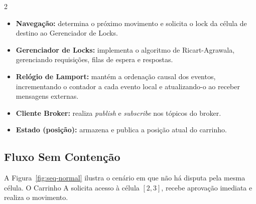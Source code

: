 \documentclass[a4paper]{article}
\begin{document}
\begin{multicols}{2}
\setlength{\columnsep}{0.5cm}

\begin{itemize}
    \item \textbf{Navega\c{c}\~ao:} determina o pr\'oximo movimento e solicita o lock da c\'elula de destino ao Gerenciador de Locks.
    \item \textbf{Gerenciador de Locks:} implementa o algoritmo de Ricart-Agrawala, gerenciando requisi\c{c}\~oes, filas de espera e respostas.
    \item \textbf{Rel\'ogio de Lamport:} mant\'em a ordena\c{c}\~ao causal dos eventos, incrementando o contador a cada evento local e atualizando-o ao receber mensagens externas.
    \item \textbf{Cliente Broker:} realiza \textit{publish} e \textit{subscribe} nos t\'opicos do broker.
    \item \textbf{Estado (posi\c{c}\~ao):} armazena e publica a posi\c{c}\~ao atual do carrinho.
\end{itemize}

\subsection{Fluxo Sem Conten\c{c}\~ao}

A Figura~\ref{fig:seq-normal} ilustra o cen\'ario em que n\~ao h\'a disputa pela mesma c\'elula. O Carrinho A solicita acesso \`a c\'elula $[2,3]$, recebe aprova\c{c}\~ao imediata e realiza o movimento.

\end{multicols}
\end{document}
